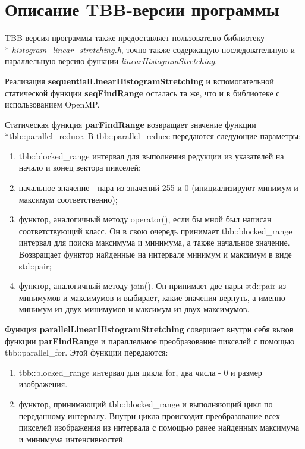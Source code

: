 \documentclass[14pt, russian]{extarticle}
\begin{document}
	\section{Описание TBB-версии программы}

    TBB-версия программы также предоставляет пользователю библиотеку\\* \emph{histogram\_linear\_stretching.h}, точно также содержащую последовательную и параллельную версию функции \emph{linearHistogramStretching}.

	Реализация \textbf{sequentialLinearHistogramStretching} и вспомогательной статической функции \textbf{seqFindRange} осталась та же, что и в библиотеке с использованием OpenMP.
    
    Статическая функция \textbf{parFindRange} возвращает значение функции \\*tbb::parallel\_reduce. В tbb::parallel\_reduce передаются следующие параметры:
    \begin{enumerate}
    \item{tbb::blocked\_range интервал для выполнения редукции из указателей на начало и конец вектора пикселей;}
    \item{начальное значение - пара из значений 255 и 0 (инициализируют минимум и максимум соответственно);}
    \item{функтор, аналогичный методу operator(), если бы мной был написан соответствующий класс. Он в свою очередь принимает tbb::blocked\_range интервал для поиска максимума и минимума, а также начальное значение. Возвращает функтор найденные на интервале минимум и максимум в виде std::pair;}
    \item{функтор, аналогичный методу join(). Он принимает две пары std::pair из минимумов и максимумов и выбирает, какие значения вернуть, а именно минимум из двух минимумов и максимум из двух максимумов.}
    \end{enumerate}
    
    Функция \textbf{parallelLinearHistogramStretching} совершает внутри себя вызов функции \textbf{parFindRange} и параллельное преобразование пикселей с помощью tbb::parallel\_for. Этой функции передаются:
    \begin{enumerate}
    \item{tbb::blocked\_range интервал для цикла for, два числа - 0 и размер изображения.}
    \item{функтор, принимающий tbb::blocked\_range и выполняющий цикл по переданному интервалу. Внутри цикла происходит преобразование всех пикселей изображения из интервала с помощью ранее найденных максимума и минимума интенсивностей.}
    \end{enumerate}
\end{document}

